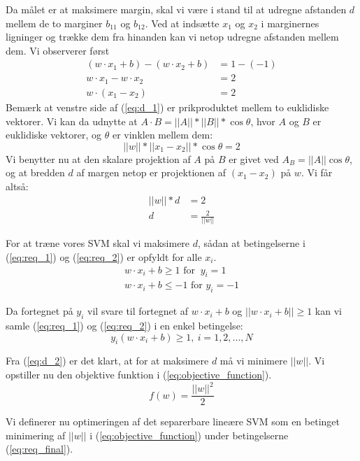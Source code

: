 \documentclass{article}
\begin{document}
Da målet er at maksimere margin, skal vi være i stand til at udregne afstanden $d$ mellem de to marginer $b_{11}$ og $b_{12}$. Ved at indsætte $x_1$ og $x_2$ i marginernes ligninger og trække dem fra hinanden kan vi netop udregne afstanden mellem dem. Vi observerer først
\begin{align}
(w\cdot x_1 + b) - (w\cdot x_2 +b) &= 1 - (-1)\\
w\cdot x_1 - w\cdot x_2 &= 2\\
w\cdot(x_1-x_2)&=2
\label{eq:d_1}
\end{align}
Bemærk at venstre side af (\ref{eq:d_1}) er prikproduktet mellem to euklidiske vektorer. Vi kan da udnytte at $A\cdot B = ||A||*||B||*\cos\theta$, hvor $A$ og $B$ er euklidiske vektorer, og $\theta$ er vinklen mellem dem:
\begin{equation}
||w||*||x_1-x_2||*\cos\theta=2
\end{equation}
Vi benytter nu at den skalare projektion af $A$ på $B$ er givet ved $A_B=||A||\cos\theta$, og at bredden $d$ af margen netop er projektionen af $(x_1-x_2)$ på $w$. Vi får altså:
\begin{align}
||w||* d &= 2\\
\label{eq:d_2}
d&=\frac{2}{||w||}
\end{align}


For at træne vores SVM skal vi maksimere $d$, sådan at betingelserne i (\ref{eq:req_1}) og (\ref{eq:req_2}) er opfyldt for alle $x_i$.
\begin{align}
\label{eq:req_1}
w \cdot x_i + b \geq 1 \text{ for } \ y_i = 1\\
\label{eq:req_2}
w \cdot x_i + b \leq -1 \text{ for } y_i = -1
\end{align}

Da fortegnet på $y_i$ vil svare til fortegnet af $w\cdot x_i+b$ og $||w\cdot x_i+b||\geq 1$ kan vi samle (\ref{eq:req_1}) og (\ref{eq:req_2}) i en enkel betingelse:
\begin{equation}
\label{eq:req_final}
y_i(w \cdot x_i + b) \geq 1, \ i =1,2,...,N
\end{equation}

Fra (\ref{eq:d_2}) er det klart, at for at maksimere $d$ må vi minimere $||w||$. Vi opstiller nu den objektive funktion i (\ref{eq:objective_function}).
\begin{equation}
\label{eq:objective_function}
f(w)=\frac{||w||^2}{2}
\end{equation}

Vi definerer nu optimeringen af det separerbare lineære SVM som en betinget minimering af $||w||$ i (\ref{eq:objective_function}) under betingelserne (\ref{eq:req_final}).
\end{document}
